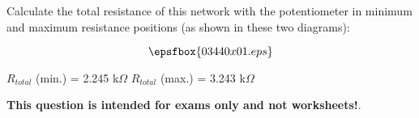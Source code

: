 

Calculate the total resistance of this network with the potentiometer in minimum and maximum resistance positions (as shown in these two diagrams):

$$\epsfbox{03440x01.eps}$$







$R_{total}$ (min.) = 2.245 k$\Omega$ \hskip 100pt $R_{total}$ (max.) = 3.243 k$\Omega$







{\bf This question is intended for exams only and not worksheets!}.



